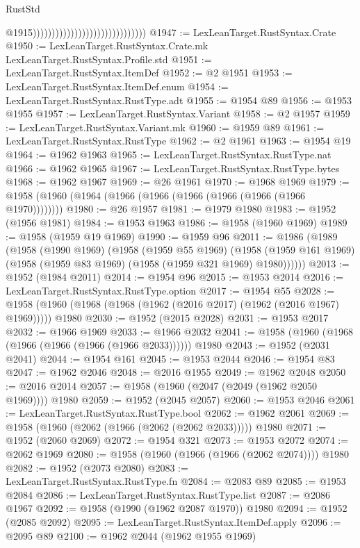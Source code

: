 \begin{lexlean}{RustStd}
\begin{coremodule}
                                                                @1915))))))))))))))))))))))))))))))
@1947 := LexLeanTarget.RustSyntax.Crate
@1950 := LexLeanTarget.RustSyntax.Crate.mk LexLeanTarget.RustSyntax.Profile.std
@1951 := LexLeanTarget.RustSyntax.ItemDef
@1952 := @2 @1951
@1953 := LexLeanTarget.RustSyntax.ItemDef.enum
@1954 := LexLeanTarget.RustSyntax.RustType.adt
@1955 := @1954 @89
@1956 := @1953 @1955
@1957 := LexLeanTarget.RustSyntax.Variant
@1958 := @2 @1957
@1959 := LexLeanTarget.RustSyntax.Variant.mk
@1960 := @1959 @89
@1961 := LexLeanTarget.RustSyntax.RustType
@1962 := @2 @1961
@1963 := @1954 @19
@1964 := @1962 @1963
@1965 := LexLeanTarget.RustSyntax.RustType.nat
@1966 := @1962 @1965
@1967 := LexLeanTarget.RustSyntax.RustType.bytes
@1968 := @1962 @1967
@1969 := @26 @1961
@1970 := @1968 @1969
@1979 := @1958 (@1960 (@1964 (@1966 (@1966 (@1966 (@1966 (@1966 (@1966 @1970))))))))
@1980 := @26 @1957
@1981 := @1979 @1980
@1983 := @1952 (@1956 @1981)
@1984 := @1953 @1963
@1986 := @1958 (@1960 @1969)
@1989 := @1958 (@1959 @19 @1969)
@1990 := @1959 @96
@2011 := @1986
    (@1989
      (@1958
        (@1990 @1969)
        (@1958
          (@1959 @55 @1969)
          (@1958 (@1959 @161 @1969) (@1958 (@1959 @83 @1969) (@1958 (@1959 @321 @1969) @1980))))))
@2013 := @1952 (@1984 @2011)
@2014 := @1954 @96
@2015 := @1953 @2014
@2016 := LexLeanTarget.RustSyntax.RustType.option
@2017 := @1954 @55
@2028 := @1958 (@1960 (@1968 (@1968 (@1962 (@2016 @2017) (@1962 (@2016 @1967) @1969))))) @1980
@2030 := @1952 (@2015 @2028)
@2031 := @1953 @2017
@2032 := @1966 @1969
@2033 := @1966 @2032
@2041 := @1958 (@1960 (@1968 (@1966 (@1966 (@1966 (@1966 @2033)))))) @1980
@2043 := @1952 (@2031 @2041)
@2044 := @1954 @161
@2045 := @1953 @2044
@2046 := @1954 @83
@2047 := @1962 @2046
@2048 := @2016 @1955
@2049 := @1962 @2048
@2050 := @2016 @2014
@2057 := @1958 (@1960 (@2047 (@2049 (@1962 @2050 @1969)))) @1980
@2059 := @1952 (@2045 @2057)
@2060 := @1953 @2046
@2061 := LexLeanTarget.RustSyntax.RustType.bool
@2062 := @1962 @2061
@2069 := @1958 (@1960 (@2062 (@1966 (@2062 (@2062 @2033))))) @1980
@2071 := @1952 (@2060 @2069)
@2072 := @1954 @321
@2073 := @1953 @2072
@2074 := @2062 @1969
@2080 := @1958 (@1960 (@1966 (@1966 (@2062 @2074)))) @1980
@2082 := @1952 (@2073 @2080)
@2083 := LexLeanTarget.RustSyntax.RustType.fn
@2084 := @2083 @89
@2085 := @1953 @2084
@2086 := LexLeanTarget.RustSyntax.RustType.list
@2087 := @2086 @1967
@2092 := @1958 (@1990 (@1962 @2087 @1970)) @1980
@2094 := @1952 (@2085 @2092)
@2095 := LexLeanTarget.RustSyntax.ItemDef.apply
@2096 := @2095 @89
@2100 := @1962 @2044 (@1962 @1955 @1969)

\end{coremodule}
\end{lexlean}
